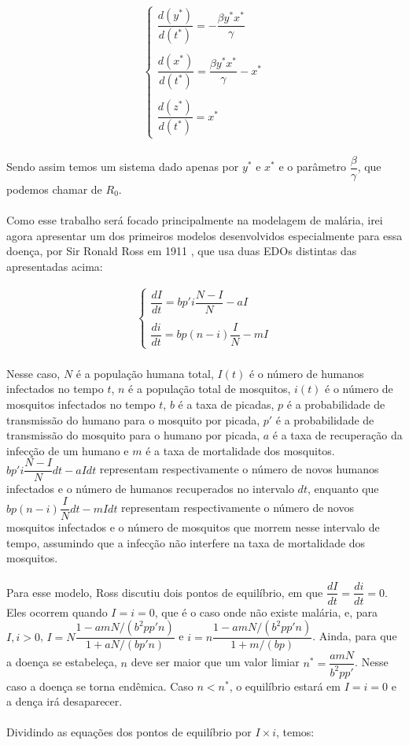 \begin{gather*}
\begin{cases}
\dfrac{d(y^*)}{d(t^*)} = -\dfrac{\beta y^*x^*}{\gamma} \\
\\
\dfrac{d(x^*)}{d(t^*)} = \dfrac{\beta y^*x^*}{\gamma} - x^* \\
\\
\dfrac{d(z^*)}{d(t^*)} = x^*
\end{cases}
\end{gather*}
\\
Sendo assim temos um sistema dado apenas por $y^*$ e $x^*$ e o parâmetro 
$\dfrac{\beta}{\gamma}$, que podemos chamar de $R_0$.
\\\\
Como esse trabalho será focado principalmente na modelagem de malária, 
irei agora apresentar um dos primeiros modelos desenvolvidos especialmente 
para essa doença, por Sir Ronald Ross em 1911 \cite{Bacaër2011}, que usa duas EDOs 
distintas das apresentadas acima:

\begin{gather*}
\begin{cases}
\dfrac{dI}{dt} = bp'i\dfrac{N-I}{N} -aI\\
\\
\dfrac{di}{dt} = bp(n-i)\dfrac{I}{N} - mI
\end{cases}
\end{gather*}
\\
Nesse caso, $N$ é a população humana total, $I(t)$ é o número de humanos 
infectados no tempo $t$, $n$ é a população total de mosquitos, $i(t)$ é o 
número de mosquitos infectados no tempo $t$, $b$ é a taxa de picadas, $p$ 
é a probabilidade de transmissão do humano para o mosquito por picada, $p'$ 
é a probabilidade de transmissão do mosquito para o humano por picada, $a$ é 
a taxa de recuperação da infecção de um humano e $m$ é a taxa de mortalidade 
dos mosquitos. $bp'i\dfrac{N-I}{N}dt -aIdt$ representam respectivamente o 
número de novos humanos infectados e o número de humanos recuperados no 
intervalo $dt$, enquanto que $bp(n-i)\dfrac{I}{N}dt - mIdt$ representam 
respectivamente o número de novos mosquitos infectados e o número de 
mosquitos que morrem nesse intervalo de tempo, assumindo que a infecção 
não interfere na taxa de mortalidade dos mosquitos.
\\\\
Para esse modelo, Ross discutiu dois pontos de equilíbrio, em que 
$\dfrac{dI}{dt} = \dfrac{di}{dt} = 0$. Eles ocorrem quando $I=i=0$, 
que é o caso onde não existe malária, e, para $I, i > 0$, 
$I = N\dfrac{1-amN/(b^2pp'n)}{1+aN/(bp'n)}$ e 
$i = n\dfrac{1-amN/(b^2pp'n)}{1+m/(bp)}$. Ainda, para que a doença se 
estabeleça, $n$ deve ser maior que um valor limiar $n^* = \dfrac{amN}{b^2pp'}$. 
Nesse caso a doença se torna endêmica. Caso $n<n^*$, o equilíbrio estará em 
$I=i=0$ e a dença irá desaparecer.
\\\\
Dividindo as equações dos pontos de equilíbrio por $I \times i$, temos:


